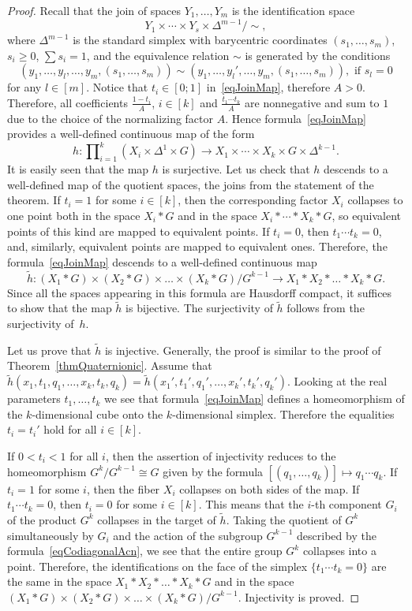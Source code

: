 \documentclass[10pt,a4paper]{amsart}
\newcommand{\hh}{\tilde{h}}
\newcommand{\simc}{\!\!\sim}
\begin{document}
\begin{proof}
Recall that the join of spaces $Y_1,\ldots,Y_m$ is the identification space
\[
Y_1\times\cdots\times Y_s\times \Delta^{m-1}/\simc,
\]
where $\Delta^{m-1}$ is the standard simplex with barycentric coordinates $(s_1,\ldots,s_m)$, $s_i\geqslant 0$, $\sum s_i=1$, and the equivalence relation $\sim$ is generated by the conditions
\[
(y_1,\ldots,y_l,\ldots,y_m,(s_1,\ldots,s_m))\sim (y_1,\ldots,y_l',\ldots,y_m,(s_1,\ldots,s_m)), \text{ if }s_l=0
\]
for any $l\in[m]$. Notice that $t_i\in[0;1]$ in~\eqref{eqJoinMap}, therefore $A>0$. Therefore, all coefficients $\frac{1-t_i}{A}$, $i\in[k]$ and $\frac{t_1\cdots t_k}{A}$ are nonnegative and sum to $1$ due to the choice of the normalizing factor $A$. Hence formula~\eqref{eqJoinMap} provides a well-defined continuous map of the form
\[
h\colon\prod\nolimits_{i=1}^{k}(X_i\times \Delta^1\times G)\to X_1\times\cdots\times X_k\times G\times \Delta^{k-1}.
\]
It is easily seen that the map $h$ is surjective. Let us check that $h$ descends to a well-defined map of the quotient spaces, the joins from the statement of the theorem. If $t_i=1$ for some $i\in[k]$, then the corresponding factor $X_i$ collapses to one point both in the space $X_i\ast G$ and in the space $X_i\ast\cdots \ast X_k\ast G$, so equivalent points of this kind are mapped to equivalent points. If $t_i=0$, then $t_1\cdots t_k=0$, and, similarly, equivalent points are mapped to equivalent ones. Therefore, the formula~\eqref{eqJoinMap} descends to a well-defined continuous map
\[
\hh\colon (X_1\ast G)\times (X_2\ast G)\times \ldots \times (X_k\ast G)/G^{k-1} \to X_1\ast X_2\ast \ldots\ast X_k\ast G.
\]
Since all the spaces appearing in this formula are Hausdorff compact, it suffices to show that the map $\hh$ is bijective. The surjectivity of $\hh$ follows from the surjectivity of~$h$.

Let us prove that $\hh$ is injective. Generally, the proof is similar to the proof of Theorem~\ref{thmQuaternionic}. Assume that
$\hh(x_1,t_1,q_1,\ldots,x_k,t_k,q_k) = \hh(x_1',t_1', q_1',\ldots, x_k',t_k',q_k')$. Looking at the real parameters $t_1,\ldots,t_k$ we see that formula~\eqref{eqJoinMap} defines a homeomorphism of the $k$-dimensional cube onto the $k$-dimensional simplex. Therefore the equalities $t_i=t_i'$ hold for all $i\in[k]$.

If $0<t_i<1$ for all $i$, then the assertion of injectivity reduces to the homeomorphism $G^k/G^{k-1}\cong G$ given by the formula $[(q_1,\ldots,q_k)]\mapsto q_1\cdots q_k$. If $t_i=1$ for some $i$, then the fiber $X_i$ collapses on both sides of the map. If $t_1\cdots t_k=0$, then $t_i=0$ for some $i\in[k]$. This means that the $i$-th component $G_i$ of the product $G^k$ collapses in the target of $\hh$. Taking the quotient of $G^k$ simultaneously by $G_i$ and the action of the subgroup $G^{k-1}$ described by the formula~\eqref{eqCodiagonalAcn}, we see that the entire group $G^k$ collapses into a point. Therefore, the identifications on the face of the simplex $\{t_1\cdots t_k=0\}$ are the same in the space $X_1\ast X_2\ast \ldots\ast X_k\ast G$ and in the space $(X_1\ast G)\times (X_2\ast G)\times \ldots \times (X_k\ast G)/G^{k-1}$. Injectivity is proved.
\end{proof}
\end{document}
